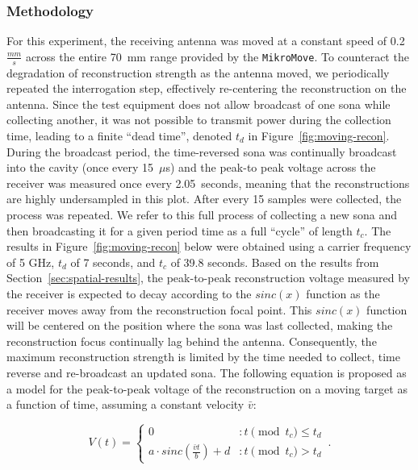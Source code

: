 \subsubsection{Methodology}
For this experiment, the receiving antenna was moved at a constant speed of 0.2~$\frac{mm}{s}$ across the entire 70~mm range provided by the \texttt{MikroMove}. To counteract the degradation of reconstruction strength as the antenna moved, we periodically repeated the interrogation step, effectively re-centering the reconstruction on the antenna. Since the test equipment does not allow broadcast of one sona while collecting another, it was not possible to transmit power during the collection time, leading to a finite ``dead time'', denoted $t_d$ in Figure~\ref{fig:moving-recon}. During the broadcast period, the time-reversed sona was continually broadcast into the cavity (once every 15~$\mu$s) and the peak-to peak voltage across the receiver was measured once every 2.05~seconds, meaning that the reconstructions are highly undersampled in this plot. After every 15 samples were collected, the process was repeated. We refer to this full process of collecting a new sona and then broadcasting it for a given period time as a full ``cycle'' of length $t_c$. The results in Figure~\ref{fig:moving-recon}  below were obtained using a carrier frequency of 5 GHz, $t_d$ of 7 seconds, and $t_c$ of 39.8 seconds. Based on the results from Section~\ref{sec:spatial-results}, the peak-to-peak reconstruction voltage measured by the receiver is expected to decay according to the $sinc(x)$ function as the receiver
moves away from the reconstruction focal point. This $sinc(x)$ function will be centered on the position where the sona was last collected, making the reconstruction focus continually lag behind the antenna. Consequently, the maximum reconstruction strength is limited by the time needed to collect, time reverse and re-broadcast an updated sona. The following equation is proposed as a model for the peak-to-peak voltage of the reconstruction on a moving target as a
function of time, assuming a constant velocity $\bar{v}$:

\begin{equation}\label{eq:vt}
  V(t) = \left\{
        \begin{array}{ll}
                0 & : t\pmod{t_c} \le t_d \\
                a\cdot sinc(\frac{\bar{v}t}{b})+d & : t\pmod{t_c} > t_d
        \end{array}\,.
  \right.
\end{equation}


